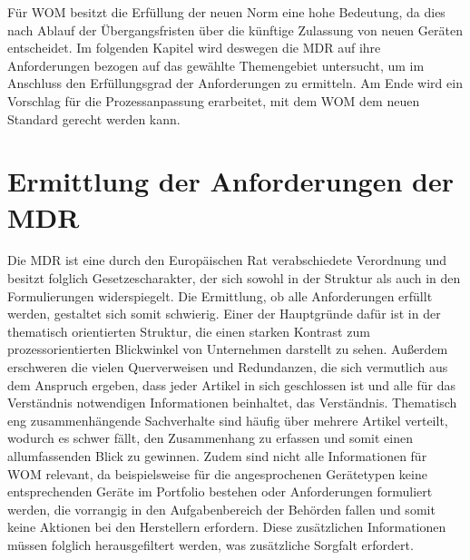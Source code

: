 \documentclass[a4paper,12pt]{report}
\begin{document}
Für WOM besitzt die Erfüllung der neuen Norm eine hohe Bedeutung, da dies nach Ablauf der Übergangsfristen über die künftige Zulassung von neuen Geräten entscheidet. Im folgenden Kapitel wird deswegen die MDR auf ihre Anforderungen bezogen auf das gewählte Themengebiet untersucht, um im Anschluss den Erfüllungsgrad der Anforderungen zu ermitteln. Am Ende wird ein Vorschlag für die Prozessanpassung erarbeitet, mit dem WOM dem neuen Standard gerecht werden kann.
\section{Ermittlung der Anforderungen der MDR}
Die MDR ist eine durch den Europäischen Rat verabschiedete Verordnung und besitzt folglich Gesetzescharakter, der sich sowohl in der Struktur als auch in den Formulierungen widerspiegelt. Die Ermittlung, ob alle Anforderungen erfüllt werden, gestaltet sich somit schwierig. Einer der Hauptgründe dafür ist in der thematisch orientierten Struktur, die einen starken Kontrast zum prozessorientierten Blickwinkel von Unternehmen darstellt zu sehen. Außerdem erschweren die vielen Querverweisen und Redundanzen, die sich vermutlich aus dem Anspruch ergeben, dass jeder Artikel in sich geschlossen ist und alle für das Verständnis notwendigen Informationen beinhaltet, das Verständnis. Thematisch eng zusammenhängende Sachverhalte sind häufig über mehrere Artikel verteilt, wodurch es schwer fällt, den Zusammenhang zu erfassen und somit einen allumfassenden Blick zu gewinnen. Zudem sind nicht alle Informationen für WOM relevant, da beispielsweise für die angesprochenen Gerätetypen keine entsprechenden Geräte im Portfolio bestehen oder Anforderungen formuliert werden, die vorrangig in den Aufgabenbereich der Behörden fallen und somit keine Aktionen bei den Herstellern erfordern. Diese zusätzlichen Informationen müssen folglich herausgefiltert werden, was zusätzliche Sorgfalt erfordert.
\end{document}
